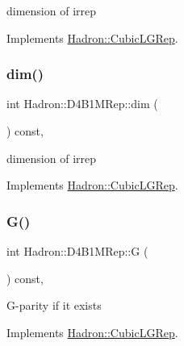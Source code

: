dimension of irrep 

Implements \mbox{\hyperlink{structHadron_1_1CubicLGRep_a3acbaea26503ed64f20df693a48e4cdd}{Hadron\+::\+Cubic\+L\+G\+Rep}}.

\mbox{\label{structHadron_1_1D4B1MRep_a157803c0c4f71990cbc71bd4f37f3254}} 
\subsubsection{\texorpdfstring{dim()}{dim()}\hspace{0.1cm}{\footnotesize\ttfamily [2/2]}}
{\footnotesize\ttfamily int Hadron\+::\+D4\+B1\+M\+Rep\+::dim (\begin{DoxyParamCaption}{ }\end{DoxyParamCaption}) const\hspace{0.3cm}{\ttfamily [inline]}, {\ttfamily [virtual]}}

dimension of irrep 

Implements \mbox{\hyperlink{structHadron_1_1CubicLGRep_a3acbaea26503ed64f20df693a48e4cdd}{Hadron\+::\+Cubic\+L\+G\+Rep}}.

\mbox{\label{structHadron_1_1D4B1MRep_a43f4d688952f8690788611d18abc6d28}} 
\subsubsection{\texorpdfstring{G()}{G()}\hspace{0.1cm}{\footnotesize\ttfamily [1/2]}}
{\footnotesize\ttfamily int Hadron\+::\+D4\+B1\+M\+Rep\+::G (\begin{DoxyParamCaption}{ }\end{DoxyParamCaption}) const\hspace{0.3cm}{\ttfamily [inline]}, {\ttfamily [virtual]}}

G-\/parity if it exists 

Implements \mbox{\hyperlink{structHadron_1_1CubicLGRep_ace26f7b2d55e3a668a14cb9026da5231}{Hadron\+::\+Cubic\+L\+G\+Rep}}.

\mbox{\label{structHadron_1_1D4B1MRep_a43f4d688952f8690788611d18abc6d28}} 
